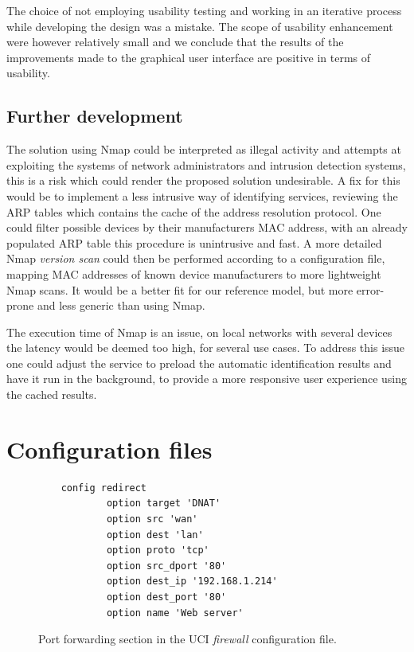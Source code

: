 \documentclass[a4paper,11pt,makeidx]{kth-bcs}
\begin{document}
The choice of not employing usability testing and working in an iterative process while developing the design was a mistake.
The scope of usability enhancement were however relatively small and we conclude that the results of the improvements made to the graphical user interface are positive in terms of usability.

\newpage
\section{Further development}
The solution using Nmap could be interpreted as illegal activity and attempts at exploiting the systems of network administrators and intrusion detection systems, this is a risk which could render the proposed solution undesirable.
A fix for this would be to implement a less intrusive way of identifying services, reviewing the ARP tables which contains the cache of the address resolution protocol.
One could filter possible devices by their manufacturers MAC address, with an already populated ARP table this procedure is unintrusive and fast.
A more detailed Nmap \emph{version scan} could then be performed according to a configuration file, mapping MAC addresses of known device manufacturers to more lightweight Nmap scans.
It would be a better fit for our reference model, but more error-prone and less generic than using Nmap.

The execution time of Nmap is an issue, on local networks with several devices the latency would be deemed too high, for several use cases.
To address this issue one could adjust the service to preload the automatic identification results and have it run in the background, to provide a more responsive user experience using the cached results.

\newpage
\newpage
\appendix
\addappheadtotoc
\chapter{Configuration files}\label{appA}

   \begin{figure}[ht]
      \centering
      \begin{lstlisting}
    config redirect               
            option target 'DNAT' 
            option src 'wan'
            option dest 'lan'
            option proto 'tcp'
            option src_dport '80'
            option dest_ip '192.168.1.214'
            option dest_port '80' 
            option name 'Web server'
      \end{lstlisting}
      \caption{
         \small{
Port forwarding section in the UCI \emph{firewall} configuration file.
         }
      }
      \label{fig:redirect_conf}
   \end{figure}
\end{document}
